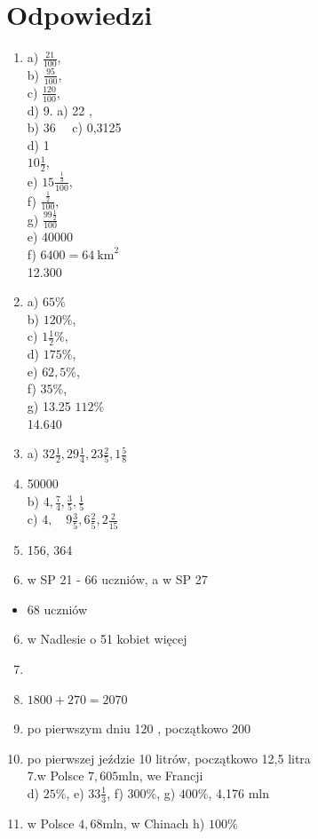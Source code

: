 \documentclass[10pt]{article}
\begin{document}
\section*{Odpowiedzi}
\begin{enumerate}
  \item a) \(\frac{21}{100}\),\\
b) \(\frac{95}{100}\),\\
c) \(\frac{120}{100}\),\\
d) 9. a) 22 ,\\
b) \(36 \quad\) c) 0,3125\\
d) 1\\
\(10 \frac{1}{2}\),\\
e) \(15 \frac{\frac{1}{3}}{100}\),\\
f) \(\frac{\frac{1}{2}}{100}\),\\
g) \(\frac{99 \frac{1}{2}}{100}\)\\
e) 40000\\
f) \(6400=64 \mathrm{~km}^{2}\)\\
12.300
  \item a) \(65 \%\)\\
b) \(120 \%\),\\
c) \(1 \frac{1}{2} \%\),\\
d) \(175 \%\),\\
e) \(62,5 \%\),\\
f) \(35 \%\),\\
g) 13.25 \(112 \%\)\\
14.640
  \item a) \(32 \frac{1}{2}, 29 \frac{1}{4}, 23 \frac{2}{5}, 1 \frac{5}{8}\)
  \item 50000\\
b) \(4, \frac{7}{4}, \frac{3}{5}, \frac{1}{5}\)\\
c) \(4, \quad 9 \frac{3}{5}, 6 \frac{2}{5}, 2 \frac{2}{15}\)
  \item 156, 364
  \item w SP 21 - 66 uczniów, a w SP 27
\end{enumerate}

\begin{itemize}
  \item 68 uczniów
\end{itemize}

\begin{enumerate}
  \setcounter{enumi}{5}
  \item w Nadlesie o 51 kobiet więcej
  \item 
  \item \(1800+270=2070\)
  \item po pierwszym dniu 120 , początkowo 200
  \item po pierwszej jeździe 10 litrów, początkowo 12,5 litra\\
7.w Polsce \(7,605 \mathrm{mln}\), we Francji\\
d) \(25 \%\), e) \(33 \frac{1}{3}\), f) \(300 \%\), g) \(400 \%\), 4,176 mln
  \item w Polsce \(4,68 \mathrm{mln}\), w Chinach h) \(100 \%\)
\end{enumerate}
\end{document}
